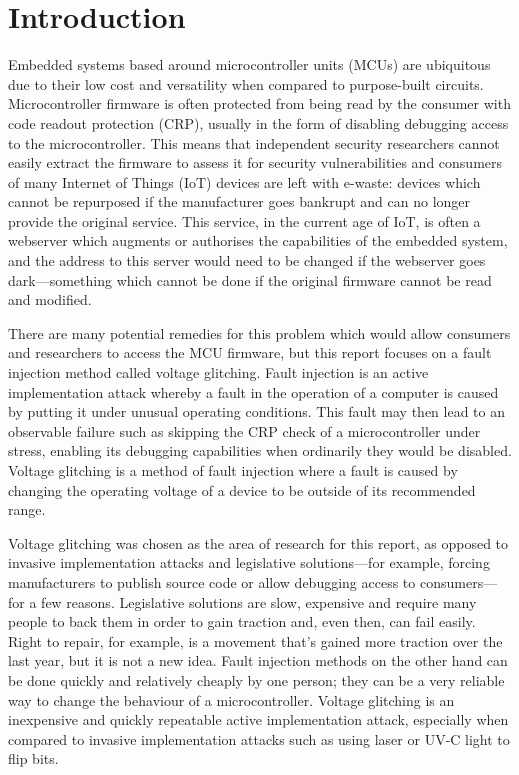 \newpage
\tableofcontents

\hypertarget{introduction}{%
\section{Introduction}\label{introduction}}

Embedded systems based around microcontroller units (MCUs) are
ubiquitous due to their low cost and versatility when compared to
purpose-built circuits. Microcontroller firmware is often protected from
being read by the consumer with code readout protection (CRP), usually
in the form of disabling debugging access to the microcontroller. This
means that independent security researchers cannot easily extract the
firmware to assess it for security vulnerabilities and consumers of many
Internet of Things (IoT) devices are left with e-waste: devices which
cannot be repurposed if the manufacturer goes bankrupt and can no longer
provide the original service. This service, in the current age of IoT,
is often a webserver which augments or authorises the capabilities of
the embedded system, and the address to this server would need to be
changed if the webserver goes dark---something which cannot be done if
the original firmware cannot be read and modified.

There are many potential remedies for this problem which would allow
consumers and researchers to access the MCU firmware, but this report
focuses on a fault injection method called voltage glitching. Fault
injection is an active implementation attack whereby a fault in the
operation of a computer is caused by putting it under unusual operating
conditions. This fault may then lead to an observable failure such as
skipping the CRP check of a microcontroller under stress, enabling its
debugging capabilities when ordinarily they would be disabled. Voltage
glitching is a method of fault injection where a fault is caused by
changing the operating voltage of a device to be outside of its
recommended range.

Voltage glitching was chosen as the area of research for this report, as
opposed to invasive implementation attacks and legislative
solutions---for example, forcing manufacturers to publish source code or
allow debugging access to consumers---for a few reasons. Legislative
solutions are slow, expensive and require many people to back them in
order to gain traction and, even then, can fail easily. Right to repair,
for example, is a movement that's gained more traction over the last
year, but it is not a new idea. Fault injection methods on the other
hand can be done quickly and relatively cheaply by one person; they can
be a very reliable way to change the behaviour of a microcontroller.
Voltage glitching is an inexpensive and quickly repeatable active
implementation attack, especially when compared to invasive
implementation attacks such as using laser or UV-C light to flip bits.

